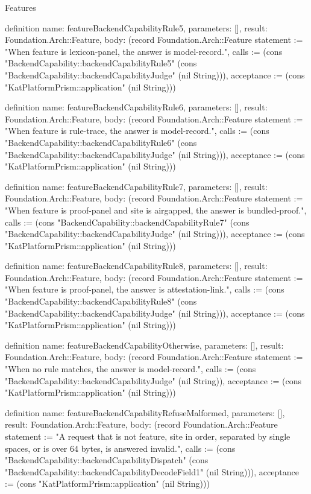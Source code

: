 \begin{lexlean}{Features}
\begin{semanticmodule}
definition{
  name: featureBackendCapabilityRule5,
  parameters: [],
  result: Foundation.Arch::Feature,
  body: (record Foundation.Arch::Feature {statement := "When feature is lexicon-panel, the answer is model-record.", calls := (cons "BackendCapability::backendCapabilityRule5" (cons "BackendCapability::backendCapabilityJudge" (nil String))), acceptance := (cons "KatPlatformPrism::application" (nil String))})
}

definition{
  name: featureBackendCapabilityRule6,
  parameters: [],
  result: Foundation.Arch::Feature,
  body: (record Foundation.Arch::Feature {statement := "When feature is rule-trace, the answer is model-record.", calls := (cons "BackendCapability::backendCapabilityRule6" (cons "BackendCapability::backendCapabilityJudge" (nil String))), acceptance := (cons "KatPlatformPrism::application" (nil String))})
}

definition{
  name: featureBackendCapabilityRule7,
  parameters: [],
  result: Foundation.Arch::Feature,
  body: (record Foundation.Arch::Feature {statement := "When feature is proof-panel and site is airgapped, the answer is bundled-proof.", calls := (cons "BackendCapability::backendCapabilityRule7" (cons "BackendCapability::backendCapabilityJudge" (nil String))), acceptance := (cons "KatPlatformPrism::application" (nil String))})
}

definition{
  name: featureBackendCapabilityRule8,
  parameters: [],
  result: Foundation.Arch::Feature,
  body: (record Foundation.Arch::Feature {statement := "When feature is proof-panel, the answer is attestation-link.", calls := (cons "BackendCapability::backendCapabilityRule8" (cons "BackendCapability::backendCapabilityJudge" (nil String))), acceptance := (cons "KatPlatformPrism::application" (nil String))})
}

definition{
  name: featureBackendCapabilityOtherwise,
  parameters: [],
  result: Foundation.Arch::Feature,
  body: (record Foundation.Arch::Feature {statement := "When no rule matches, the answer is model-record.", calls := (cons "BackendCapability::backendCapabilityJudge" (nil String)), acceptance := (cons "KatPlatformPrism::application" (nil String))})
}

definition{
  name: featureBackendCapabilityRefuseMalformed,
  parameters: [],
  result: Foundation.Arch::Feature,
  body: (record Foundation.Arch::Feature {statement := "A request that is not feature, site in order, separated by single spaces, or is over 64 bytes, is answered invalid.", calls := (cons "BackendCapability::backendCapabilityDispatch" (cons "BackendCapability::backendCapabilityDecodeField1" (nil String))), acceptance := (cons "KatPlatformPrism::application" (nil String))})
}


\end{semanticmodule}
\end{lexlean}
